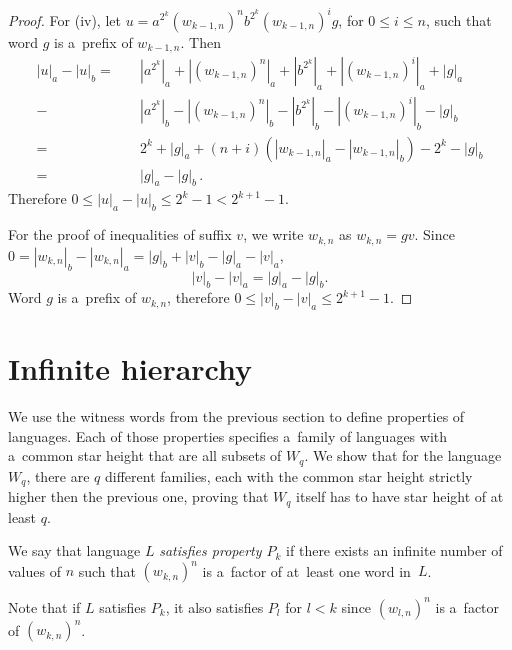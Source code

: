 \begin{proof}
    For (iv), let $u = a^{2^k} {(w_{k-1,n})}^n b^{2^k} {(w_{k-1,n})}^i g$, for $0 \leq i \leq n$, such that word $g$ is a~prefix of $w_{k-1,n}$. Then
    \begin{align*}
        |u|_a - |u|_b = \quad &|a^{2^k}|_a + |{(w_{k-1,n})}^n|_a + |b^{2^k}|_a + |{(w_{k-1,n})}^i|_a + |g|_a \\
        - &|a^{2^k}|_b - |{(w_{k-1,n})}^n|_b - |b^{2^k}|_b - |{(w_{k-1,n})}^i|_b - |g|_b \\
        = \quad &2^k + |g|_a + (n+i)(|w_{k-1,n}|_a - |w_{k-1,n}|_b) - 2^k - |g|_b \\
        = \quad &|g|_a - |g|_b \, .
    \end{align*}
    Therefore $0 \leq |u|_a - |u|_b \leq 2^k - 1 < 2^{k+1}-1$.

    For the proof of inequalities of suffix $v$, we write $w_{k,n}$ as $w_{k,n} = gv$. Since $0 = |w_{k,n}|_b - |w_{k,n}|_a = |g|_b + |v|_b - |g|_a - |v|_a$,
    \[
        |v|_b - |v|_a = |g|_a - |g|_b.
    \]
    Word $g$ is a~prefix of $w_{k,n}$, therefore $0 \leq |v|_b - |v|_a \leq 2^{k+1}-1$.
\end{proof}

\section{Infinite hierarchy}

We use the witness words from the previous section to define properties of languages. Each of those properties specifies a~family of languages with a~common star height that are all subsets of $W_q$. We show that for the language $W_q$, there are $q$ different families, each with the common star height strictly higher then the previous one, proving that $W_q$ itself has to have star height of at least $q$.

\begin{defn}
    We say that language $L$ \emph{satisfies property $P_k$} if there exists an infinite number of values of $n$ such that ${(w_{k,n})}^n$ is a~factor of at~least one word in~$L$.
\end{defn}

Note that if $L$ satisfies $P_k$, it also satisfies $P_l$ for $l < k$ since ${(w_{l,n})}^n$ is a~factor of ${(w_{k,n})}^n$.


